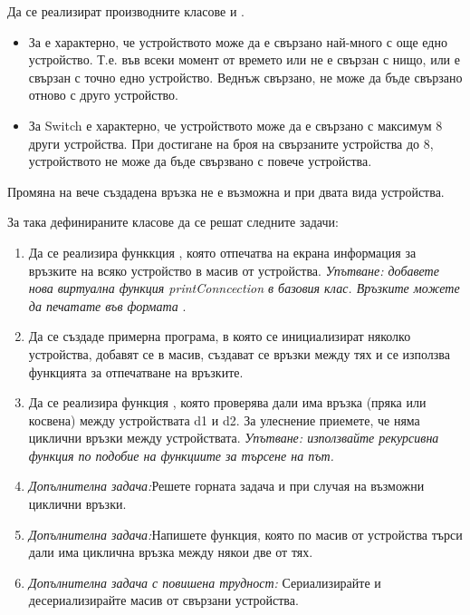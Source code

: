 \begin{enumerate}[resume]
	Да се реализират производните класове  и .

	\begin{itemize}
		\item За  е характерно, че устройството може да е свързано най-много с още едно устройство. Т.е. във всеки момент от времето  или не е свързан с нищо, или е свързан с точно едно устройство. Веднъж свързано,  не може да бъде свързано отново с друго устройство.

		\item За Switch е характерно, че устройството може да е свързано с максимум 8 други устройства. При достигане на броя на свързаните устройства до 8, устройството  не може да бъде свързвано с повече устройства.

	\end{itemize}

	Промяна на вече създадена връзка не е възможна и при двата вида устройства.

	За така дефинираните класове да се решат следните задачи:


	\begin{enumerate}[label=\alph*)]
		\item Да се реализира функкция , която отпечатва на екрана информация за връзките на всяко устройство в масив от устройства. \textit{Упътване: добавете нова виртуална функция printConncection в базовия клас. Връзките можете да печатате във формата }.

		\item Да се създаде примерна програма, в която се инициализират няколко устройства, добавят се в масив, създават се връзки между тях и се използва функцията  за отпечатване на връзките.

		\item Да се реализира функция , която проверява дали има връзка (пряка или косвена) между устройствата d1 и d2. За улеснение приемете, че няма циклични връзки между устройствата. \textit{Упътване: използвайте рекурсивна функция по подобие на функциите за търсене на път.}

		\item \textit{Допълнителна задача:}Решете горната задача и при случая на възможни циклични връзки.

		\item \textit{Допълнителна задача:}Напишете функция, която по масив от устройства търси дали има циклична връзка между някои две от тях.

		\item \textit{Допълнителна задача с повишена трудност:} Сериализирайте и десериализирайте масив от свързани устройства.
	\end{enumerate}




\end{enumerate}


